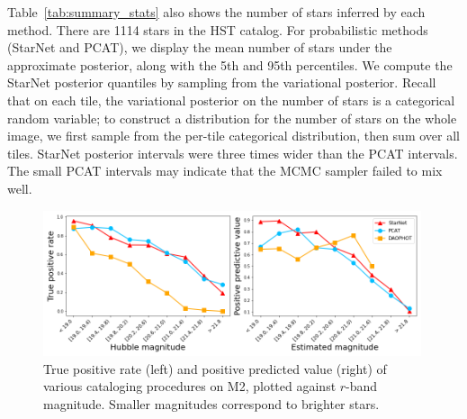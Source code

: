 Table~\ref{tab:summary_stats} also shows the number of stars inferred by each method.
There are 1114 stars in the HST catalog.
For probabilistic methods (StarNet and PCAT),
we display the mean number of stars under the approximate posterior, along with the 5th and 95th percentiles.
We compute the StarNet posterior quantiles by sampling from the variational posterior. 
Recall that on each tile, the variational posterior on the number of stars is a categorical random variable; 
to construct a distribution for the number of stars on the whole image, we first sample from the per-tile categorical distribution, then sum over all tiles. 
StarNet posterior intervals were three times wider than the PCAT intervals.
The small PCAT intervals may indicate that the MCMC sampler failed to mix well.





\begin{figure}[tb]
    \centering
    \includegraphics[width=0.99\textwidth]{figures/m2_results/summary_statistics_m2.png}
    \caption{True positive rate (left) and positive predicted value (right) of various cataloging
    procedures on M2, plotted against $r$-band magnitude.
    Smaller magnitudes correspond to brighter stars.
    }
    \label{fig:summary_stats}
\end{figure}


